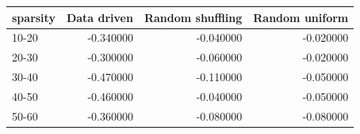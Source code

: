 \begin{tabular}{lrrr}
\toprule
sparsity & Data driven & Random shuffling & Random uniform \\
\midrule
10-20 & -0.340000 & -0.040000 & -0.020000 \\
20-30 & -0.300000 & -0.060000 & -0.020000 \\
30-40 & -0.470000 & -0.110000 & -0.050000 \\
40-50 & -0.460000 & -0.040000 & -0.050000 \\
50-60 & -0.360000 & -0.080000 & -0.080000 \\
\bottomrule
\end{tabular}
